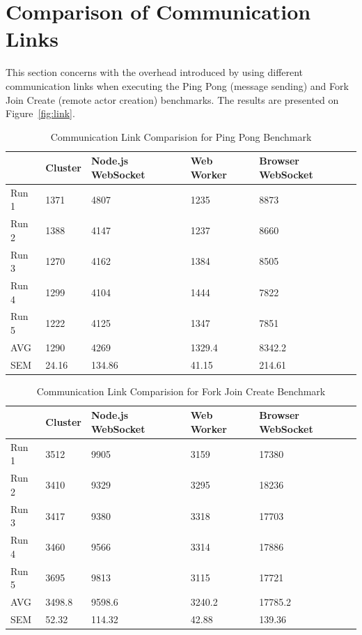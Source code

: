 \documentclass[oneside]{um-fict}
\begin{document}
\section{Comparison of Communication Links}
This section concerns with the overhead introduced by using different communication links when executing the Ping Pong (message sending) and Fork Join Create (remote actor creation) benchmarks. The results are presented on Figure~\ref{fig:link}.
\begin{table}[H]
    \begin{center}
        \begin{tabular}{|l|llll|}
        \hline
        & Cluster & Node.js WebSocket & Web Worker & Browser WebSocket \\ \hline
        Run 1 & 1371    & 4807              & 1235       & 8873              \\
        Run 2 & 1388    & 4147              & 1237       & 8660              \\
        Run 3 & 1270    & 4162              & 1384       & 8505              \\
        Run 4 & 1299    & 4104              & 1444       & 7822              \\
        Run 5 & 1222    & 4125              & 1347       & 7851              \\ \hline
        AVG   & 1290    & 4269              & 1329.4     & 8342.2            \\
        SEM   & 24.16   & 134.86            & 41.15      & 214.61            \\ \hline
        \end{tabular}
        \caption{Communication Link Comparision for Ping Pong Benchmark}\label{tab:pingpongcomms}
    \end{center}
\end{table}
\begin{table}[H]
    \begin{center}
        \begin{tabular}{|l|llll|}
        \hline
        & Cluster & Node.js WebSocket & Web Worker & Browser WebSocket \\ \hline
        Run 1 & 3512    & 9905              & 3159       & 17380             \\
        Run 2 & 3410    & 9329              & 3295       & 18236             \\
        Run 3 & 3417    & 9380              & 3318       & 17703             \\
        Run 4 & 3460    & 9566              & 3314       & 17886             \\
        Run 5 & 3695    & 9813              & 3115       & 17721             \\ \hline
        AVG   & 3498.8  & 9598.6            & 3240.2     & 17785.2           \\
        SEM   & 52.32   & 114.32            & 42.88      & 139.36            \\ \hline
        \end{tabular}
        \caption{Communication Link Comparision for Fork Join Create Benchmark}\label{tab:fjcreatecomms}
    \end{center}
\end{table}
\end{document}
